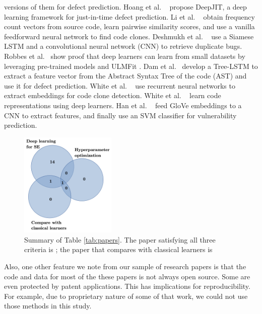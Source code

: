 \documentclass[10pt,compsoc,twocolumn]{IEEEtran}
\begin{document}
versions of them for defect prediction. Hoang et al. ~\cite{hoang2019deepjit} propose DeepJIT, a deep learning framework for just-in-time defect prediction. Li et al. ~\cite{li2017cclearner} obtain frequency count vectors from source code, learn pairwise similarity scores, and use a vanilla feedforward neural network to find code clones. Deshmukh et al. ~\cite{deshmukh2017towards} use a Siamese LSTM \cite{koch2015siamese} and a convolutional neural network (CNN) to retrieve duplicate
bugs. Robbes et al.~\cite{robbes2019leveraging} show proof that deep learners can learn from small datasets by leveraging pre-trained models and ULMFit \cite{howard2018universal}. Dam et al.~\cite{dam2019lessons} develop a Tree-LSTM \cite{tai2015improved} to extract a feature vector from the Abstract Syntax Tree of
 the code (AST) and use it for defect prediction. White et al. ~\cite{white2016deep} use recurrent neural networks to extract embeddings for
 code clone detection. White et al. ~\cite{white2015toward} learn code representations using deep learners. Han et al. ~\cite{han2017learning} feed GloVe \cite{pennington2014glove} embeddings to a CNN to extract features, and finally use an SVM classifier for vulnerability prediction.
 

    \begin{figure}
     \begin{center}
    \includegraphics[width=1.8in]{venn.png}
       \end{center} 
    \caption{Summary of Table \ref{tab:papers}. The paper satisfying all three criteria is \cite{wang2016automatically}; the paper that compares with classical learners is \cite{dam2019lessons}}
    \label{fig:venn}
\end{figure}Also, one other feature we note from our sample of research papers
 is that the code and data for most of the these papers is not always open source. Some are even protected by patent applications. This has implications for reproducibility.  For example,  due to proprietary nature of some of that work, we could not use those methods in this study. 
 
\end{document}
